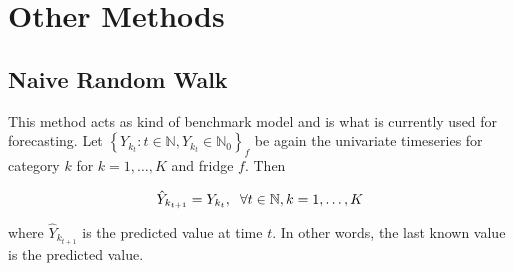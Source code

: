 \section{Other Methods}
\label{sec: Other methods}

\subsection{Naive Random Walk}
\label{sec: Naive Random Walk}

This method acts as kind of benchmark model and is what is currently used for forecasting. Let $\left\{Y_{k_t}:t\in \mathbb{N}, Y_{k_t} \in \mathbb{N}_0\right\}_f$ be again the univariate timeseries for category $k$ for $k=1,\ldots,K$ and fridge $f$. Then

\begin{equation}
\hat{Y}_{k_{t+1}}= Y_{k_t} ,\hspace{0.2cm} \forall t \in \mathbb{N}, k=1,\ldots,K
\label{eq: Random Walk Model}
\end{equation}

where $\hat{Y}_{k_{t+1}}$ is the predicted value at time $t$. In other words, the last known value is the predicted value. 